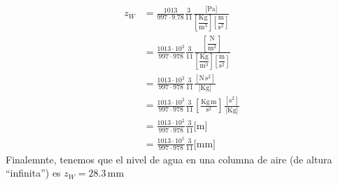 \documentclass[class=article, crop=false]{standalone}
\begin{document}
\begin{align*}
      z_W &= \frac{1013}{997 \cdot 9.78} \frac{3}{11} \frac{\big[\text{Pa}\big]}{\left[\dfrac{\text{Kg}}{\text{m}^3}\right]\left[\dfrac{\text{m}}{\text{s}^2}\right]} \\
       &= \frac{1013\cdot 10^2}{997 \cdot 978} \frac{3}{11} \frac{\left[\dfrac{\text{N}}{\text{m}^2}\right]}{\left[\dfrac{\text{Kg}}{\text{m}^3}\right]\left[\dfrac{\text{m}}{\text{s}^2}\right]} \\
       &= \frac{1013\cdot 10^2}{997 \cdot 978} \frac{3}{11} \frac{\left[\text{N}\,\text{s}^2\right]}{\big[\text{Kg}\big]}\\
       &= \frac{1013\cdot 10^2}{997 \cdot 978} \frac{3}{11}\left[\frac{\text{Kg}\,\text{m}}{\text{s}^2}\right] \frac{\left[\text{s}^2\right]}{\big[\text{Kg}\big]}\\
       &= \frac{1013\cdot 10^2}{997 \cdot 978} \frac{3}{11} \big[\text{m}\big]\\
       &= \frac{1013\cdot 10^5}{997 \cdot 978} \frac{3}{11} \big[\text{mm}\big]
\end{align*}
Finalemnte, tenemos que el nivel de agua en una columna de aire (de altura ``infinita'') es $z_W = 28.3\,$mm
\end{document}

